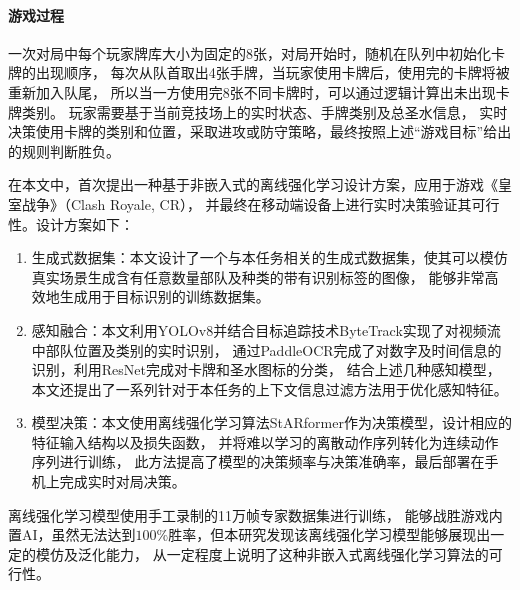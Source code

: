 \paragraph*{游戏过程}一次对局中每个玩家牌库大小为固定的8张，对局开始时，随机在队列中初始化卡牌的出现顺序，
每次从队首取出4张手牌，当玩家使用卡牌后，使用完的卡牌将被重新加入队尾，
所以当一方使用完8张不同卡牌时，可以通过逻辑计算出未出现卡牌类别。
玩家需要基于当前竞技场上的实时状态、手牌类别及总圣水信息，
实时决策使用卡牌的类别和位置，采取进攻或防守策略，最终按照上述“游戏目标”给出的规则判断胜负。

在本文中，首次提出一种基于非嵌入式的离线强化学习设计方案，应用于游戏《皇室战争》（Clash Royale, CR），
并最终在移动端设备上进行实时决策验证其可行性。设计方案如下：
\begin{enumerate}
  \item 生成式数据集：本文设计了一个与本任务相关的生成式数据集，使其可以模仿真实场景生成含有任意数量部队及种类的带有识别标签的图像，
  能够非常高效地生成用于目标识别的训练数据集。
  \item 感知融合：本文利用YOLOv8并结合目标追踪技术ByteTrack实现了对视频流中部队位置及类别的实时识别，
  通过PaddleOCR完成了对数字及时间信息的识别，利用ResNet完成对卡牌和圣水图标的分类，
  结合上述几种感知模型，本文还提出了一系列针对于本任务的上下文信息过滤方法用于优化感知特征。
  \item 模型决策：本文使用离线强化学习算法StARformer作为决策模型，设计相应的特征输入结构以及损失函数，
  并将难以学习的离散动作序列转化为连续动作序列进行训练，
  此方法提高了模型的决策频率与决策准确率，最后部署在手机上完成实时对局决策。
\end{enumerate}

离线强化学习模型使用手工录制的11万帧专家数据集进行训练，
能够战胜游戏内置AI，虽然无法达到$100\%$胜率，但本研究发现该离线强化学习模型能够展现出一定的模仿及泛化能力，
从一定程度上说明了这种非嵌入式离线强化学习算法的可行性。
